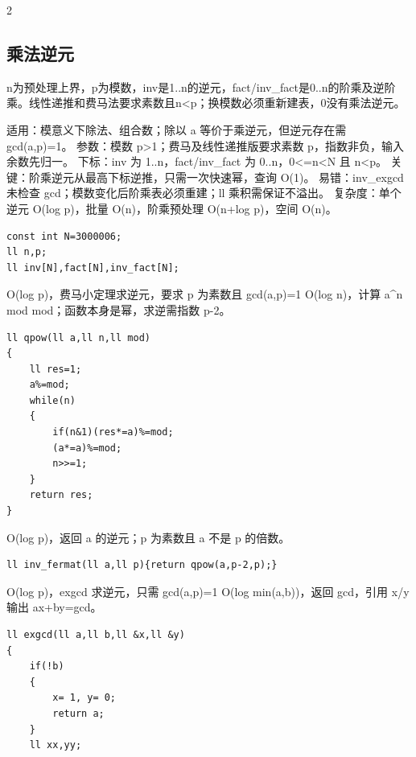 \documentclass[UTF8,fontset=fandol,a4paper,twoside]{ctexart}
\newcommand{\note}[1]{{\fontsize{10}{12}\selectfont #1\par}}
\begin{document}
\begin{multicols}{2}
\subsection{乘法逆元}

\note{n为预处理上界，p为模数，inv是1.\allowbreak{}.\allowbreak{}n的逆元，fact/\allowbreak{}inv\_fact是0.\allowbreak{}.\allowbreak{}n的阶乘及逆阶乘。线性递推和费马法要求素数且n<\allowbreak{}p；换模数必须重新建表，0没有乘法逆元。}
\note{适用：模意义下除法、组合数；除以 a 等价于乘逆元，但逆元存在需 gcd(\allowbreak{}a,\allowbreak{}p)\allowbreak{}=\allowbreak{}1。 参数：模数 p>\allowbreak{}1；费马及线性递推版要求素数 p，指数非负，输入余数先归一。 下标：inv 为 1.\allowbreak{}.\allowbreak{}n，fact/\allowbreak{}inv\_fact 为 0.\allowbreak{}.\allowbreak{}n，0<\allowbreak{}=\allowbreak{}n<\allowbreak{}N 且 n<\allowbreak{}p。 关键：阶乘逆元从最高下标逆推，只需一次快速幂，查询 O(\allowbreak{}1)\allowbreak{}。 易错：inv\_exgcd 未检查 gcd；模数变化后阶乘表必须重建；ll 乘积需保证不溢出。 复杂度：单个逆元 O(\allowbreak{}log p)\allowbreak{}，批量 O(\allowbreak{}n)\allowbreak{}，阶乘预处理 O(\allowbreak{}n+\allowbreak{}log p)\allowbreak{}，空间 O(\allowbreak{}n)\allowbreak{}。}
\begin{lstlisting}
const int N=3000006;
ll n,p;
ll inv[N],fact[N],inv_fact[N];
\end{lstlisting}
\note{O(\allowbreak{}log p)\allowbreak{}，费马小定理求逆元，要求 p 为素数且 gcd(\allowbreak{}a,\allowbreak{}p)\allowbreak{}=\allowbreak{}1 O(\allowbreak{}log n)\allowbreak{}，计算 a\textasciicircum{}n mod mod；函数本身是幂，求逆需指数 p-\allowbreak{}2。}
\begin{lstlisting}
ll qpow(ll a,ll n,ll mod)
{
    ll res=1;
    a%=mod;
    while(n)
    {
        if(n&1)(res*=a)%=mod;
        (a*=a)%=mod;
        n>>=1;
    }
    return res;
}
\end{lstlisting}
\note{O(\allowbreak{}log p)\allowbreak{}，返回 a 的逆元；p 为素数且 a 不是 p 的倍数。}
\begin{lstlisting}
ll inv_fermat(ll a,ll p){return qpow(a,p-2,p);}
\end{lstlisting}
\note{O(\allowbreak{}log p)\allowbreak{}，exgcd 求逆元，只需 gcd(\allowbreak{}a,\allowbreak{}p)\allowbreak{}=\allowbreak{}1 O(\allowbreak{}log min(\allowbreak{}a,\allowbreak{}b)\allowbreak{})\allowbreak{}，返回 gcd，引用 x/\allowbreak{}y 输出 ax+\allowbreak{}by=\allowbreak{}gcd。}
\begin{lstlisting}
ll exgcd(ll a,ll b,ll &x,ll &y)
{
    if(!b)
    {
        x= 1, y= 0;
        return a;
    }
    ll xx,yy;

\end{lstlisting}
\end{multicols}
\end{document}
